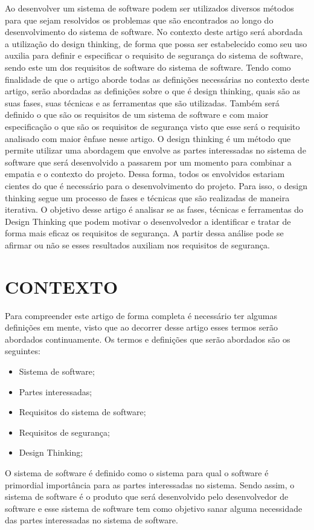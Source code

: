 \documentclass[a4paper,twoside]{article}
\begin{document}
Ao desenvolver um sistema de software podem ser utilizados diversos métodos para que sejam resolvidos os problemas que são encontrados ao longo do desenvolvimento do sistema de software. No contexto deste artigo será abordada a utilização do design thinking, de forma que possa ser estabelecido  como seu uso auxilia para definir e especificar o requisito de segurança do sistema de software, sendo este um dos requisitos de software do sistema de software. Tendo como finalidade de que o artigo aborde todas as definições necessárias no contexto deste artigo, serão abordadas as definições sobre o que é design thinking, quais são as suas fases, suas técnicas e as ferramentas que são utilizadas. Também será definido o que são os requisitos de um sistema de software e com maior especificação o que são os requisitos de segurança visto que esse será o requisito analisado com maior ênfase nesse artigo. 
O design thinking é um método que permite utilizar uma abordagem que envolve as partes interessadas no sistema de software que será desenvolvido a passarem por um momento para combinar a empatia e o contexto do projeto. Dessa forma, todos os envolvidos estariam cientes do que é necessário para o desenvolvimento do projeto. Para isso, o design thinking segue um processo de fases e técnicas que são realizadas de maneira iterativa.
O objetivo desse artigo é analisar se as fases, técnicas e ferramentas do Design Thinking que podem motivar o desenvolvedor a identificar e tratar de forma mais eficaz os requisitos de segurança. A partir dessa análise pode se afirmar ou não se esses resultados auxiliam nos requisitos de segurança\cite{Definicao}\cite{Sommerville_2011_texbook}.
\label{sec:introduction}

\section{\uppercase{Contexto}}

Para compreender este artigo de forma completa é necessário ter algumas definições em mente, visto que ao decorrer desse artigo esses termos serão abordados continuamente. Os termos e definições que serão abordados são os seguintes:
\begin{itemize}
    \item Sistema de software;
    \item Partes interessadas;
    \item Requisitos do sistema de software;
    \item Requisitos de segurança;
    \item Design Thinking;
\end{itemize}
O sistema de software é definido como o sistema para qual o software é primordial importância para as partes interessadas no sistema\cite{sevocab}. Sendo assim, o sistema de software é o produto que será desenvolvido pelo desenvolvedor de software e esse sistema de software tem como objetivo sanar alguma necessidade das partes interessadas no sistema de software. 
\end{document}
